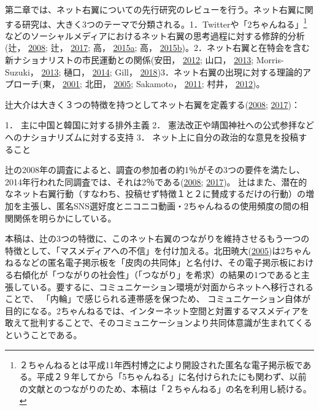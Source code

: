 \documentclass[10pt,british,A4paper,oneside]{memoir}
\begin{document}
第二章では、ネット右翼についての先行研究のレビューを行う。ネット右翼に関する研究は、大きく3つのテーマで分類される。1．Twitterや「2ちゃんねる」\footnote{２ちゃんねるとは平成11年西村博之により開設された匿名な電子掲示板である。平成２９年してから「5ちゃんねる」に名付けられたにも関わず、以前の文献とのつながりのため、本稿は「２ちゃんねる」の名を利用し続ける。}などのソーシャルメディアにおけるネット右翼の思考過程に対する修辞的分析(辻，
\protect\hyperlink{ref-tsuji_eng:_2008}{2008}; 辻，
\protect\hyperlink{ref-tsuji_eng._2017}{2017}; 高，
\protect\hyperlink{ref-taka_twitter_2015}{2015}\protect\hyperlink{ref-taka_twitter_2015}{a};
高，
\protect\hyperlink{ref-taka_twitter_2015-1}{2015}\protect\hyperlink{ref-taka_twitter_2015-1}{b})。2．ネット右翼と在特会を含む新ナショナリストの市民運動との関係(安田，
\protect\hyperlink{ref-yasuda_eng:_2012}{2012}; 山口，
\protect\hyperlink{ref-yamaguchi_xenophobia_2013}{2013}; Morris-Suzuki，
\protect\hyperlink{ref-morris-suzuki_freedom_2013}{2013}; 樋口，
\protect\hyperlink{ref-higuchi_japans_2014}{2014}; Gill，
\protect\hyperlink{ref-gill_nativist_2018}{2018})3．ネット右翼の出現に対する理論的アプローチ(東，
\protect\hyperlink{ref-azuma_otaku:_2001}{2001}; 北田，
\protect\hyperlink{ref-kitada_eng:_2005}{2005}; Sakamoto，
\protect\hyperlink{ref-sakamoto_koreans_2011}{2011}; 村井，
\protect\hyperlink{ref-murai_net_2012}{2012})。

辻大介は大きく３つの特徴を持つとしてネット右翼を定義する(\protect\hyperlink{ref-tsuji_eng:_2008}{2008};
\protect\hyperlink{ref-tsuji_eng._2017}{2017})：

1． 主に中国と韓国に対する排外主義 2．
憲法改正や靖国神社への公式参拝などへのナショナリズムに対する支持 3．
ネット上に自分の政治的な意見を投稿すること

辻の2008年の調査によると、調査の参加者の約1％がその3つの要件を満たし、2014年行われた同調査では、それは2％である(\protect\hyperlink{ref-tsuji_eng:_2008}{2008};
\protect\hyperlink{ref-tsuji_eng._2017}{2017})。
辻はまた、潜在的なネット右翼行動（すなわち、投稿せず特徴１と２に賛成するだけの行動）の増加を主張し、匿名SNS選好度とニコニコ動画・2ちゃんねるの使用頻度の間の相関関係を明らかにしている。

本稿は、辻の3つの特徴に、このネット右翼のつながりを維持させるもう一つの特徴として、「マスメディアへの不信」を付け加える。北田暁大(\protect\hyperlink{ref-kitada_eng:_2005}{2005})は2ちゃんねるなどの匿名電子掲示板を「皮肉の共同体」と名付け、その電子掲示板における右傾化が「つながりの社会性」（「つながり」を希求）の結果の1つであると主張している。要するに、コミュニケーション環境が対面からネットへ移行されることで、
「内輪」で感じられる連帯感を保つため、
コミュニケーション自体が目的になる。2ちゃんねるでは、インターネット空間と対置するマスメディアを敢えて批判することで、そのコミュニケーションより共同体意識が生まれてくるということである。
\end{document}
